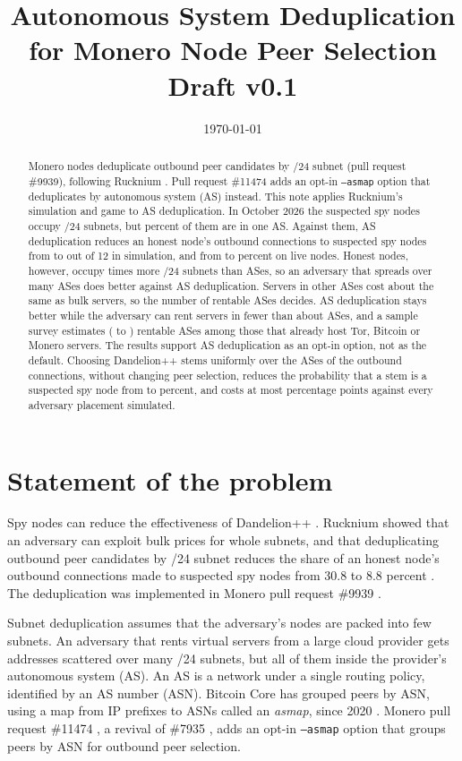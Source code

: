 \documentclass[english]{mrl}
\title{Autonomous System Deduplication for Monero Node Peer Selection\\\vspace{.3cm}
\large Draft v0.1}
\date{\today}
\theoremstyle{plain}
\begin{document}
\begin{abstract}
Monero nodes deduplicate outbound peer candidates by /24 subnet (pull request \#9939), following Rucknium \cite{Rucknium2025}. Pull request \#11474 adds an opt-in \texttt{--asmap} option that deduplicates by autonomous system (AS) instead. This note applies Rucknium's simulation and game to AS deduplication. In October 2026 the suspected spy nodes occupy \spyTwentyFourNew{} /24 subnets, but \spyTopAsnPctNew{} percent of them are in one AS. Against them, AS deduplication reduces an honest node's outbound connections to suspected spy nodes from \simNewSubnetEightyMean{} to \simNewAsmapEightyMean{} out of 12 in simulation, and from \abCtrlPct{} to \abAsmapPct{} percent on live nodes. Honest nodes, however, occupy \thresholdNew{} times more /24 subnets than ASes, so an adversary that spreads over many ASes does better against AS deduplication. Servers in other ASes cost about the same as bulk servers, so the number of rentable ASes decides. AS deduplication stays better while the adversary can rent servers in fewer than about \kBreakEven{} ASes, and a sample survey estimates \svKR{} (\svKRLoLo{} to \svKRHiHi) rentable ASes among those that already host Tor, Bitcoin or Monero servers. The results support AS deduplication as an opt-in option, not as the default. Choosing Dandelion++ stems uniformly over the ASes of the outbound connections, without changing peer selection, reduces the probability that a stem is a suspected spy node from \stemObsCur{} to \stemObsDiv{} percent, and costs at most \stemRegretDiv{} percentage points against every adversary placement simulated.
\end{abstract}

\section{Statement of the problem}

Spy nodes can reduce the effectiveness of Dandelion++ \cite{Fanti2018a}. Rucknium showed that an adversary can exploit bulk prices for whole subnets, and that deduplicating outbound peer candidates by /24 subnet reduces the share of an honest node's outbound connections made to suspected spy nodes from 30.8 to 8.8 percent \cite{Rucknium2025}. The deduplication was implemented in Monero pull request \#9939 \cite{MoneroPR9939}.

Subnet deduplication assumes that the adversary's nodes are packed into few subnets. An adversary that rents virtual servers from a large cloud provider gets addresses scattered over many /24 subnets, but all of them inside the provider's autonomous system (AS). An AS is a network under a single routing policy, identified by an AS number (ASN). Bitcoin Core has grouped peers by ASN, using a map from IP prefixes to ASNs called an \emph{asmap}, since 2020 \cite{BitcoinPR16702}. Monero pull request \#11474 \cite{MoneroPR11474}, a revival of \#7935 \cite{MoneroPR7935}, adds an opt-in \texttt{--asmap} option that groups peers by ASN for outbound peer selection.
\end{document}
